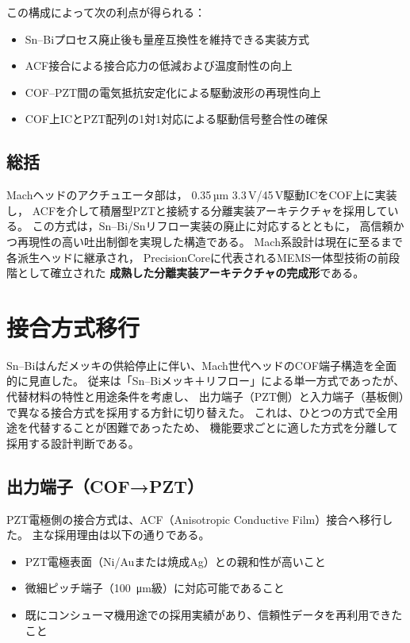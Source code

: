 \documentclass[conference]{IEEEtran}
\begin{document}
この構成によって次の利点が得られる：
\begin{itemize}
  \item Sn–Biプロセス廃止後も量産互換性を維持できる実装方式  
  \item ACF接合による接合応力の低減および温度耐性の向上  
  \item COF–PZT間の電気抵抗安定化による駆動波形の再現性向上  
  \item COF上ICとPZT配列の1対1対応による駆動信号整合性の確保  
\end{itemize}

\subsection{総括}

Machヘッドのアクチュエータ部は，
0.35\,µm 3.3\,V/45\,V駆動ICをCOF上に実装し，
ACFを介して積層型PZTと接続する分離実装アーキテクチャを採用している。  
この方式は，Sn–Bi/Snリフロー実装の廃止に対応するとともに，
高信頼かつ再現性の高い吐出制御を実現した構造である。  
Mach系設計は現在に至るまで各派生ヘッドに継承され，
PrecisionCoreに代表されるMEMS一体型技術の前段階として確立された
\textbf{成熟した分離実装アーキテクチャの完成形}である。

\section{接合方式移行}

Sn–Biはんだメッキの供給停止に伴い、Mach世代ヘッドのCOF端子構造を全面的に見直した。  
従来は「Sn–Biメッキ＋リフロー」による単一方式であったが、代替材料の特性と用途条件を考慮し、  
出力端子（PZT側）と入力端子（基板側）で異なる接合方式を採用する方針に切り替えた。  
これは、ひとつの方式で全用途を代替することが困難であったため、  
機能要求ごとに適した方式を分離して採用する設計判断である。

\subsection{出力端子（COF→PZT）}
PZT電極側の接合方式は、ACF（Anisotropic Conductive Film）接合へ移行した。  
主な採用理由は以下の通りである。

\begin{itemize}
  \item PZT電極表面（Ni/Auまたは焼成Ag）との親和性が高いこと  
  \item 微細ピッチ端子（\SI{100}{\micro m}級）に対応可能であること  
  \item 既にコンシューマ機用途での採用実績があり、信頼性データを再利用できたこと
\end{itemize}
\end{document}
